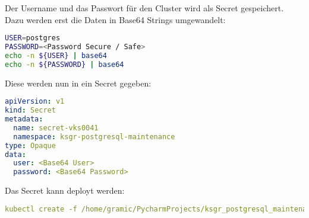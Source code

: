 \begin{flushleft}
    Der Username und das Passwort für den Cluster wird als Secret gespeichert.\\
    Dazu werden erst die Daten in Base64 Strings umgewandelt:
    \lstset{style=gra_codestyle}
    \begin{lstlisting}[language=bash, caption=Maintenance-Tool - Bloated Tables / Indices - Base64,captionpos=b,label={lst:maintenannce-tool-bloated-tables-base64},breaklines=true]
USER=postgres
PASSWORD=<Password Secure / Safe>
echo -n ${USER} | base64
echo -n ${PASSWORD} | base64
    \end{lstlisting}
    Diese werden nun in ein Secret gegeben:
    \lstset{style=gra_codestyle}
    \begin{lstlisting}[language=yaml, caption=Maintenance-Tool - Bloated Tables / Indices - Secret,captionpos=b,label={lst:maintenannce-tool-bloated-tables-secret},breaklines=true]
apiVersion: v1
kind: Secret
metadata:
  name: secret-vks0041
  namespace: ksgr-postgresql-maintenance
type: Opaque
data:
  user: <Base64 User>
  password: <Base64 Password>
    \end{lstlisting}
    Das Secret kann deployt werden:
    \lstset{style=gra_codestyle}
    \begin{lstlisting}[language=yaml, caption=Maintenance-Tool - Bloated Tables / Indices - Secret Deploy,captionpos=b,label={lst:maintenannce-tool-bloated-tables-secret-deploy},breaklines=true]
kubectl create -f /home/gramic/PycharmProjects/ksgr_postgresql_maintenance/secret_vks0041.yaml
    \end{lstlisting}
\end{flushleft}
\begin{flushleft}

\end{flushleft}